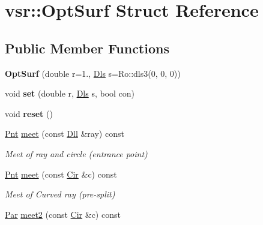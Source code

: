 \hypertarget{structvsr_1_1_opt_surf}{\section{vsr\-:\-:Opt\-Surf Struct Reference}
\label{structvsr_1_1_opt_surf}
}
\subsection*{Public Member Functions}
\begin{DoxyCompactItemize}
\item 
\hypertarget{structvsr_1_1_opt_surf_a91a27c921b255edf83631b4b87f94ce1}{{\bfseries Opt\-Surf} (double r=1., \hyperlink{classvsr_1_1_m_v}{Dls} s=Ro\-::dls3(0, 0, 0))}\label{structvsr_1_1_opt_surf_a91a27c921b255edf83631b4b87f94ce1}

\item 
\hypertarget{structvsr_1_1_opt_surf_ad498efc07e0932e1fb74952697f00d53}{void {\bfseries set} (double r, \hyperlink{classvsr_1_1_m_v}{Dls} s, bool con)}\label{structvsr_1_1_opt_surf_ad498efc07e0932e1fb74952697f00d53}

\item 
\hypertarget{structvsr_1_1_opt_surf_a81a14e20e63f5696b3de963071d284bc}{void {\bfseries reset} ()}\label{structvsr_1_1_opt_surf_a81a14e20e63f5696b3de963071d284bc}

\item 
\hypertarget{structvsr_1_1_opt_surf_a8a03d7c11ec6a1e121db932f7da421a4}{\hyperlink{namespacevsr_a2d05beb9721c5d9211b479af6d47222d}{Pnt} \hyperlink{structvsr_1_1_opt_surf_a8a03d7c11ec6a1e121db932f7da421a4}{meet} (const \hyperlink{namespacevsr_a6c6892b7aec25cfb16492501e2e35b11}{Dll} \&ray) const }\label{structvsr_1_1_opt_surf_a8a03d7c11ec6a1e121db932f7da421a4}

\begin{DoxyCompactList}\small\item\em Meet of ray and circle (entrance point) \end{DoxyCompactList}\item 
\hypertarget{structvsr_1_1_opt_surf_a962792a53ac763ac6b247accc8790fdb}{\hyperlink{namespacevsr_a2d05beb9721c5d9211b479af6d47222d}{Pnt} \hyperlink{structvsr_1_1_opt_surf_a962792a53ac763ac6b247accc8790fdb}{meet} (const \hyperlink{namespacevsr_a2744605aa828e495fc85463b7ae0d045}{Cir} \&c) const }\label{structvsr_1_1_opt_surf_a962792a53ac763ac6b247accc8790fdb}

\begin{DoxyCompactList}\small\item\em Meet of Curved ray (pre-\/split) \end{DoxyCompactList}\item 
\hypertarget{structvsr_1_1_opt_surf_a08ac1651df4cbc23f2292d36c08943de}{\hyperlink{namespacevsr_ae046793ece205351429a6346a66fd6eb}{Par} \hyperlink{structvsr_1_1_opt_surf_a08ac1651df4cbc23f2292d36c08943de}{meet2} (const \hyperlink{namespacevsr_a2744605aa828e495fc85463b7ae0d045}{Cir} \&c) const }\label{structvsr_1_1_opt_surf_a08ac1651df4cbc23f2292d36c08943de}


\end{DoxyCompactItemize}
